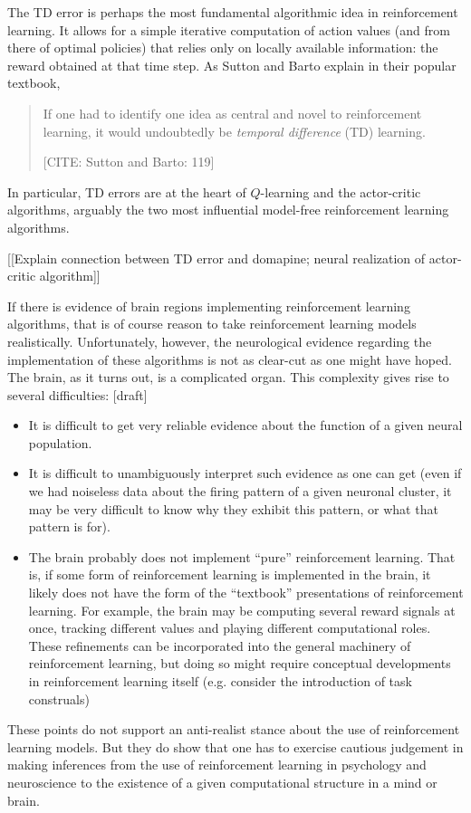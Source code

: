The TD error is perhaps the most fundamental algorithmic idea in reinforcement learning.
It allows for a simple iterative computation of action values (and from there of optimal policies) that relies only on locally available information: the reward obtained at that time step.
As Sutton and Barto explain in their popular textbook,
\begin{quote}
	If one had to identify one idea as central and novel to reinforcement learning, it would undoubtedly be \emph{temporal difference} (TD) learning.

	\hfill [CITE: Sutton and Barto: 119]
\end{quote}
In particular, TD errors are at the heart of $Q$-learning and the actor-critic algorithms, arguably the two most influential model-free reinforcement learning algorithms.

[[Explain connection between TD error and domapine; neural realization of actor-critic algorithm]]

If there is evidence of brain regions implementing reinforcement learning algorithms, that is of course reason to take reinforcement learning models realistically.
Unfortunately, however, the neurological evidence regarding the implementation of these algorithms is not as clear-cut as one might have hoped.
The brain, as it turns out, is a complicated organ.
This complexity gives rise to several difficulties:
[draft]
\begin{itemize}
	\item
		It is difficult to get very reliable evidence about the function of a given neural population.

	\item
		It is difficult to unambiguously interpret such evidence as one can get (even if we had noiseless data about the firing pattern of a given neuronal cluster, it may be very difficult to know why they exhibit this pattern, or what that pattern is for).

	\item 
		The brain probably does not implement ``pure'' reinforcement learning.
		That is, if some form of reinforcement learning is implemented in the brain, it likely does not have the form of the ``textbook'' presentations of reinforcement learning.
		For example, the brain may be computing several reward signals at once, tracking different values and playing different computational roles.
		These refinements can be incorporated into the general machinery of reinforcement learning, but doing so might require conceptual developments in reinforcement learning itself (e.g. consider the introduction of task construals)
\end{itemize}
These points do not support an anti-realist stance about the use of reinforcement learning models.
But they do show that one has to exercise cautious judgement in making inferences from the use of reinforcement learning in psychology and neuroscience to the existence of a given computational structure in a mind or brain.
